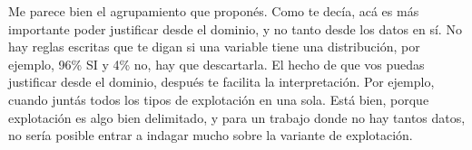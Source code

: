 \documentclass[10pt, spanish]{article}
\begin{document}
Me parece bien el agrupamiento que proponés. Como te decía, acá es más importante poder justificar desde el dominio, y no tanto desde los datos en sí. No hay reglas escritas que te digan si una variable tiene una distribución, por ejemplo, 96\% SI y 4\% no, hay que descartarla.
El hecho de que vos puedas justificar desde el dominio, después te facilita la interpretación. Por ejemplo, cuando juntás todos los tipos de explotación en una sola. Está bien, porque explotación es algo bien delimitado, y para un trabajo donde no hay tantos datos, no sería posible entrar a indagar mucho sobre la variante de explotación.








\newpage


\end{document}
